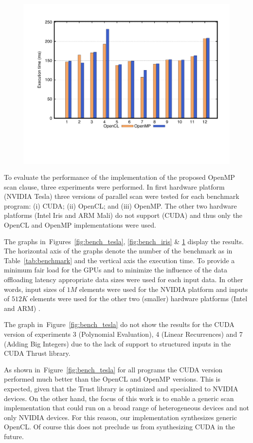 \documentclass[Ingles]{ic-tese-v1}
\newcommand{\rtab}[1]{Table~\ref{tab:#1}}
\newcommand{\rfig}[1]{Figure~\ref{fig:#1}}
\newcommand{\rfign}[3]{Figures~\ref{fig:#1}, \ref{fig:#2} \& \ref{fig:#3}}
\begin{document}
\begin{figure}[p]
{		\includegraphics[scale=0.5]{images/bench_mali.pdf}\label{fig:bench_mali}
	}
\end{figure}

To evaluate the  performance of the implementation of the
proposed  OpenMP  scan clause,  three experiments  were performed.
In first  hardware  platform (NVIDIA Tesla) three    versions  of
parallel scan were tested for each benchmark program: (i) CUDA; (ii) OpenCL; and
(iii)  OpenMP. The other two  hardware platforms (Intel Iris and ARM Mali) do not
support (CUDA) and thus only the OpenCL    and    OpenMP    implementations   were
used.

The  graphs  in~\rfign{bench_tesla}{bench_iris}{bench_mali}  display
the results.  The horizontal axis of the graphs denote the number of
the  benchmark as  in  \rtab{benchmark} and  the  vertical axis  the
execution time.   To  provide a  minimum fair load  for the
GPUs and  to minimize the  influence of the data  offloading latency
appropriate  data sizes  were used  for  each input  data. In  other
words,  input  sizes of  $1M$  elements  were  used for  the  NVIDIA
platform and inputs  of $512K$ elements were used for  the other two
(smaller) hardware platforms (Intel and ARM) .

The  graph  in~\rfig{bench_tesla}  do  not  show  the
results  for  the  CUDA  version  of  experiments  3  (Polynomial
Evaluation), 4 (Linear Recurrences) and 7 (Adding Big Integers) due to
the lack of support to structured inputs in the CUDA Thrust library.

As  shown in~\rfig{bench_tesla}  for all  programs the
CUDA   version   performed  much better   than   the   OpenCL  and   OpenMP
versions. This is expected, given  that the Trust library is optimized
and specialized  to NVIDIA devices.  On the  other hand, the  focus of
this work is to enable a generic scan implementation that could run on
a  broad range  of  heterogeneous  devices  and  not only  NVIDIA  devices.
For this  reason,  our implementation synthesizes generic OpenCL.
Of course this does not preclude us from synthesizing CUDA in the future.
\end{document}
